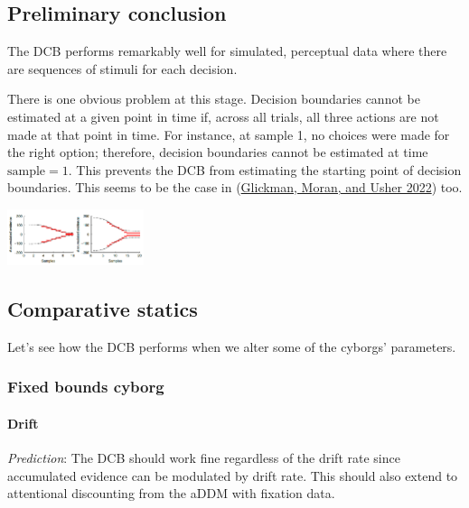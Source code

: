 \documentclass[
]{book}
\begin{document}
\hypertarget{preliminary-conclusion}{%
\subsection{Preliminary conclusion}\label{preliminary-conclusion}}

The DCB performs remarkably well for simulated, perceptual data where there are sequences of stimuli for each decision.

There is one obvious problem at this stage. Decision boundaries cannot be estimated at a given point in time if, across all trials, all three actions are not made at that point in time. For instance, at sample 1, no choices were made for the right option; therefore, decision boundaries cannot be estimated at time \(\text{sample}=1\). This prevents the DCB from estimating the starting point of decision boundaries. This seems to be the case in (\protect\hyperlink{ref-glickman2022}{Glickman, Moran, and Usher 2022}) too.

\includegraphics[width=0.3\textwidth,height=\textheight]{images/dcb-missingEarly.PNG}

\hypertarget{comparative-statics}{%
\subsection{Comparative statics}\label{comparative-statics}}

Let's see how the DCB performs when we alter some of the cyborgs' parameters.

\hypertarget{fixed-bounds-cyborg-3}{%
\subsubsection{Fixed bounds cyborg}\label{fixed-bounds-cyborg-3}}

\hypertarget{drift}{%
\paragraph*{Drift}\label{drift}}

\emph{Prediction}: The DCB should work fine regardless of the drift rate since accumulated evidence can be modulated by drift rate. This should also extend to attentional discounting from the aDDM with fixation data.
\end{document}
